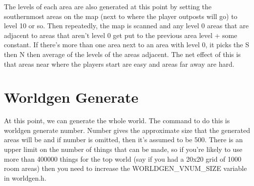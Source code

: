 The levels of each area are also generated at this point by setting
the southernmost areas on the map (next to where the player outposts
will go) to level 10 or so. Then repeatedly, the map is scanned and
any level 0 areas that are adjacent to areas that aren't level 0 get
put to the previous area level + some constant. If there's more than
one area next to an area with level 0, it picks the S then N then 
average of the levels of the areas adjacent. The net effect of this
is that areas near where the players start are easy and areas far away
are hard.

\section{Worldgen Generate}

At this point, we can generate the whole world. The command to do this is
worldgen generate number. Number gives the approximate size that
the generated areas will be and if number is omitted, then it's
assumed to be 500. There is an upper limit on the number of things
that can be made, so if you're likely to use more than 400000 things
for the top world (say if you had a 20x20 grid of 1000 room areas)
then you need to increase the WORLDGEN\_VNUM\_SIZE variable in
worldgen.h.


